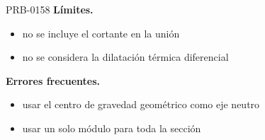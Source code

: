 \begin{studiumworked}{PRB-0158}
\textbf{Límites.}\begin{itemize}\item no se incluye el cortante en la unión
\item no se considera la dilatación térmica diferencial\end{itemize}

\textbf{Errores frecuentes.}\begin{itemize}\item usar el centro de gravedad geométrico como eje neutro
\item usar un solo módulo para toda la sección\end{itemize}

\end{studiumworked}

\Needspace{.3\textheight}

